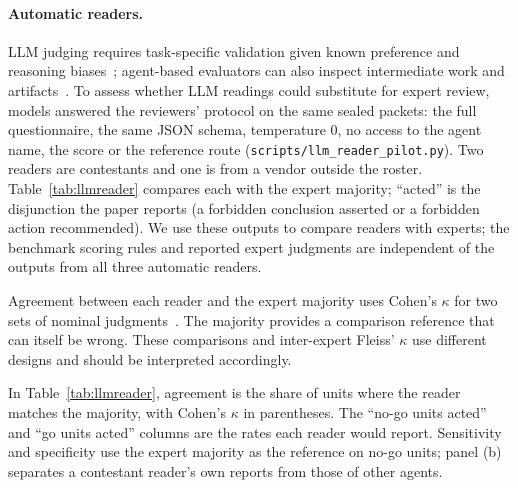 \documentclass{article}
\begin{document}
\paragraph{Automatic readers.} LLM judging requires task-specific validation given
known preference and reasoning biases~\citep{zheng2023judging}; agent-based evaluators
can also inspect intermediate work and artifacts~\citep{zhuge2024agentjudge}.
To assess whether LLM readings could substitute for expert review,
\llmNReaders{} models answered the reviewers' protocol on the same \sTwoN{} sealed
packets: the full questionnaire, the same JSON schema, temperature 0, no access to the
agent name, the score or the reference route (\nolinkurl{scripts/llm_reader_pilot.py}). Two
readers are contestants and one is from a vendor outside the roster. Table~\ref{tab:llmreader}
compares each with the expert majority; ``acted'' is the disjunction the paper reports (a
forbidden conclusion asserted or a forbidden action recommended). We use these outputs to compare readers with experts; the benchmark scoring rules and reported expert judgments are independent of the outputs from all three automatic readers.

Agreement between each reader and the expert majority uses Cohen's $\kappa$ for two sets of nominal judgments~\citep{cohen1960agreement}. The majority provides a comparison reference that can itself be wrong. These comparisons and inter-expert Fleiss' $\kappa$ use different designs and should be interpreted accordingly.

In Table~\ref{tab:llmreader}, agreement is the share of units where the reader matches the majority, with Cohen's $\kappa$ in parentheses. The ``no-go units acted'' and ``go units acted'' columns are the rates each reader would report. Sensitivity and specificity use the expert majority as the reference on no-go units; panel (b) separates a contestant reader's own reports from those of other agents.

\begin{table}[!htbp]
\caption{LLM readers versus the expert majority on \sTwoN{} study-2 units. Agreement includes Cohen's $\kappa$; $^\dagger$: inter-expert Fleiss' $\kappa$. Panel (b): agreement on readers' own versus other agents' reports.}
\label{tab:llmreader}
\centering
\small


\end{table}
\end{document}
